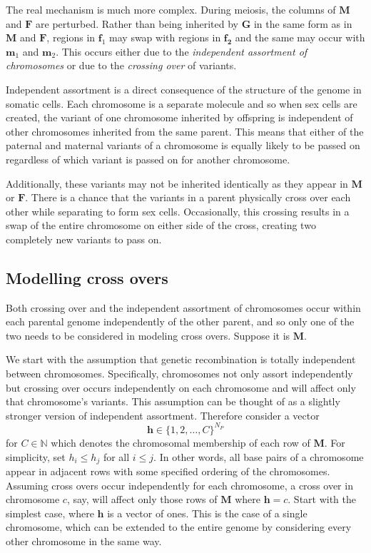 \documentclass[sts]{imsart}
\newcommand{\ve}[1]{\mathbf{#1}}           %
\newcommand{\m}[1]{\mathbf{#1}}               %
\newcommand{\field}[1]{\mathbb{#1}}
\newcommand{\Naturals}{\field{N}}
\begin{document}
The real mechanism is much more complex. During meiosis, the columns of $\m{M}$ and $\m{F}$ are perturbed. Rather than being inherited by $\m{G}$ in the same form as in $\m{M}$ and $\m{F}$, regions in $\ve{f}_1$ may swap with regions in $\ve{f_2}$ and the same may occur with $\ve{m}_1$ and $\ve{m}_2$. This occurs either due to the \emph{independent assortment of chromosomes} or due to the \emph{crossing over} of variants.

Independent assortment is a direct consequence of the structure of the genome in somatic cells. Each chromosome is a separate molecule and so when sex cells are created, the variant of one chromosome inherited by offspring is independent of other chromosomes inherited from the same parent. This means that either of the paternal and maternal variants of a chromosome is equally likely to be passed on regardless of which variant is passed on for another chromosome.

Additionally, these variants may not be inherited identically as they appear in $\m{M}$ or $\m{F}$. There is a chance that the variants in a parent physically cross over each other while separating to form sex cells. Occasionally, this crossing results in a swap of the entire chromosome on either side of the cross, creating two completely new variants to pass on.

\subsection{Modelling cross overs} \label{subsec:modelcrossing}

Both crossing over and the independent assortment of chromosomes occur within each parental genome independently of the other parent, and so only one of the two needs to be considered in modeling cross overs. Suppose it is $\m{M}$.

We start with the assumption that genetic recombination is totally independent between chromosomes. Specifically, chromosomes not only assort independently but crossing over occurs independently on each chromosome and will affect only that chromosome's variants. This assumption can be thought of as a slightly stronger version of independent assortment. Therefore consider a vector
$$\ve{h} \in \{1, 2, \dots, C\}^{N_P}$$
for $C \in \Naturals$ which denotes the chromosomal membership of each row of $\m{M}$. For simplicity, set $h_i \leq h_j$ for all $i \leq j$. In other words, all base pairs of a chromosome appear in adjacent rows with some specified ordering of the chromosomes. Assuming cross overs occur independently for each chromosome, a cross over in chromosome $c$, say, will affect only those rows of $\m{M}$ where $\ve{h} = c$. Start with the simplest case, where $\ve{h}$ is a vector of ones. This is the case of a single chromosome, which can be extended to the entire genome by considering every other chromosome in the same way.
\end{document}
